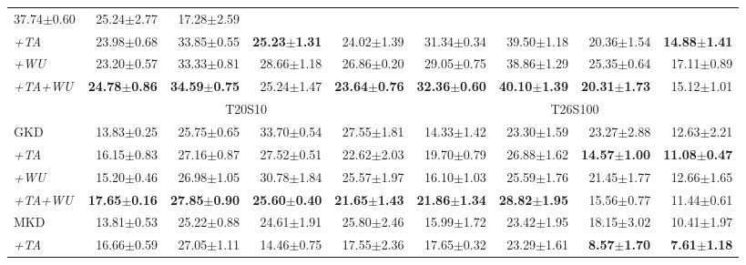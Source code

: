 \begin{appendix}
\begin{table*}[!th]
{\begin{tabular}{lrrrrrrrr}
  37.74$\pm$0.60 &
  25.24$\pm$2.77 &
  17.28$\pm$2.59 \\
\textit{+TA} &
  23.98$\pm$0.68 &
  33.85$\pm$0.55 &
  \textbf{25.23$\pm$1.31} &
  24.02$\pm$1.39 &
  31.34$\pm$0.34 &
  39.50$\pm$1.18 &
  20.36$\pm$1.54 &
  \textbf{14.88$\pm$1.41} \\
\textit{+WU} &
  23.20$\pm$0.57 &
  33.33$\pm$0.81 &
  28.66$\pm$1.18 &
  26.86$\pm$0.20 &
  29.05$\pm$0.75 &
  38.86$\pm$1.29 &
  25.35$\pm$0.64 &
  17.11$\pm$0.89 \\
\textit{+TA+WU} &
  \textbf{24.78$\pm$0.86} &
  \textbf{34.59$\pm$0.75} &
  25.24$\pm$1.47 &
  \textbf{23.64$\pm$0.76} &
  \textbf{32.36$\pm$0.60} &
  \textbf{40.10$\pm$1.39} &
  \textbf{20.31$\pm$1.73} &
  15.12$\pm$1.01 \\ \midrule
 &
  \multicolumn{4}{c}{T20S10} &
  \multicolumn{4}{c}{T26S100} \\ 
  \midrule
GKD &
  13.83$\pm$0.25 &
  25.75$\pm$0.65 &
  33.70$\pm$0.54 &
  27.55$\pm$1.81 &
  14.33$\pm$1.42 &
  23.30$\pm$1.59 &
  23.27$\pm$2.88 &
  12.63$\pm$2.21 \\
\textit{+TA} &
  16.15$\pm$0.83 &
  27.16$\pm$0.87 &
  27.52$\pm$0.51 &
  22.62$\pm$2.03 &
  19.70$\pm$0.79 &
  26.88$\pm$1.62 &
  \textbf{14.57$\pm$1.00} &
  \textbf{11.08$\pm$0.47} \\ 
\textit{+WU} &
  15.20$\pm$0.46 &
  26.98$\pm$1.05 &
  30.78$\pm$1.84 &
  25.57$\pm$1.97 &
  16.10$\pm$1.03 &
  25.59$\pm$1.76 &
  21.45$\pm$1.77 &
  12.66$\pm$1.65 \\ 
\textit{+TA+WU} &
  \textbf{17.65$\pm$0.16} &
  \textbf{27.85$\pm$0.90} &
  \textbf{25.60$\pm$0.40} &
  \textbf{21.65$\pm$1.43} &
  \textbf{21.86$\pm$1.34} &
  \textbf{28.82$\pm$1.95} &
  15.56$\pm$0.77 &
  11.44$\pm$0.61 \\ \midrule
MKD &
  13.81$\pm$0.53 &
  25.22$\pm$0.88 &
  24.61$\pm$1.91 &
  25.80$\pm$2.46 &
  15.99$\pm$1.72 &
  23.42$\pm$1.95 &
  18.15$\pm$3.02 &
  10.41$\pm$1.97 \\
\textit{+TA} &
  16.66$\pm$0.59 &
  27.05$\pm$1.11 &
  14.46$\pm$0.75 &
  17.55$\pm$2.36 &
  17.65$\pm$0.32 &
  23.29$\pm$1.61 &
  \textbf{8.57$\pm$1.70} &
  \textbf{7.61$\pm$1.18} \\

\end{tabular}}
\end{table*}
\end{appendix}
